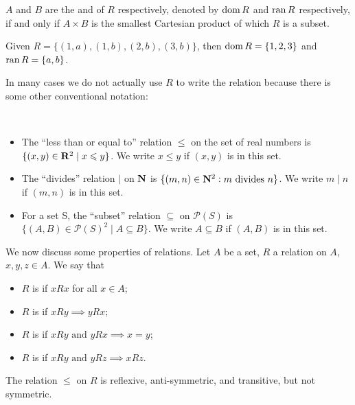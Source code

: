 $A$ and $B$ are the  and  of $R$ respectively, denoted by $\operatorname{dom} R$ and $\operatorname{ran} R$ respectively, if and only if $A \times B$ is the smallest Cartesian product of which $R$ is a subset.

\begin{example}
Given $R=\{(1,a),(1,b),(2,b),(3,b)\}$, then $\operatorname{dom} R=\{1,2,3\}$ and $\operatorname{ran} R=\{a,b\}$.
\end{example}

In many cases we do not actually use $R$ to write the relation because there is some other conventional notation:

\begin{example} \
\begin{itemize}
\item The ``less than or equal to'' relation $\le$ on the set of real numbers is $\{(x,y) \in \mathbf R^2 \mid x \leqslant y\}$. We write $x \le y$ if $(x,y)$ is in this set.
\item The ``divides'' relation $\mid$ on $\mathbf N$ is $\{(m,n) \in \mathbf N^2: m \text{ divides } n\}$. We write $m \mid n$ if $(m,n)$ is in this set.
\item For a set S, the ``subset'' relation $\subseteq$ on $\mathcal{P}(S)$ is $\{(A,B) \in \mathcal{P}(S)^2 \mid A \subseteq B\}$. We write $A \subseteq B$ if $(A,B)$ is in this set.
\end{itemize}
\end{example}

We now discuss some properties of relations. Let $A$ be a set, $R$ a relation on $A$, $x,y,z \in A$. We say that
\begin{itemize}
\item $R$ is  if $xRx$ for all $x\in A$;
\item $R$ is  if $xRy \implies yRx$;
\item $R$ is  if $xRy \text{ and } yRx \implies x=y$;
\item $R$ is \vocab{transitive} if $xRy \text{ and } yRz \implies xRz$.
\end{itemize}

\begin{example}
The relation $\le$ on $R$ is reflexive, anti-symmetric, and transitive, but not symmetric. 
\end{example}

